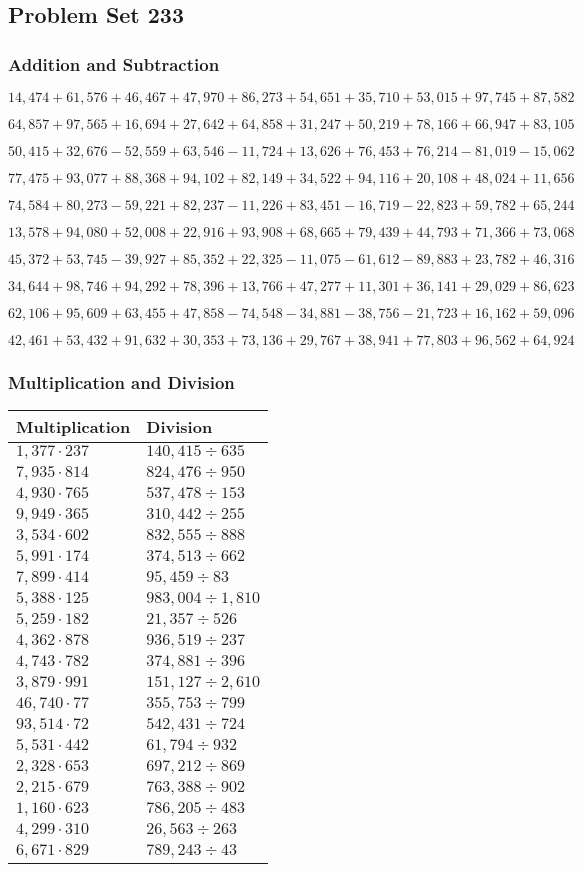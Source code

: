 \hypertarget{problem-set-233}{%
\subsection{Problem Set 233}\label{problem-set-233}}

\hypertarget{addition-and-subtraction}{%
\subsubsection{Addition and
Subtraction}\label{addition-and-subtraction}}

\(14,474+61,576+46,467+47,970+86,273+54,651+35,710+53,015+97,745+87,582\)

\(64,857+97,565+16,694+27,642+64,858+31,247+50,219+78,166+66,947+83,105\)

\(50,415+32,676-52,559+63,546-11,724+13,626+76,453+76,214-81,019-15,062\)

\(77,475+93,077+88,368+94,102+82,149+34,522+94,116+20,108+48,024+11,656\)

\(74,584+80,273-59,221+82,237-11,226+83,451-16,719-22,823+59,782+65,244\)

\(13,578+94,080+52,008+22,916+93,908+68,665+79,439+44,793+71,366+73,068\)

\(45,372+53,745-39,927+85,352+22,325-11,075-61,612-89,883+23,782+46,316\)

\(34,644+98,746+94,292+78,396+13,766+47,277+11,301+36,141+29,029+86,623\)

\(62,106+95,609+63,455+47,858-74,548-34,881-38,756-21,723+16,162+59,096\)

\(42,461+53,432+91,632+30,353+73,136+29,767+38,941+77,803+96,562+64,924\)

\hypertarget{multiplication-and-division}{%
\subsubsection{Multiplication and
Division}\label{multiplication-and-division}}

\begin{longtable}[]{@{}ll@{}}
\toprule
Multiplication & Division\tabularnewline
\midrule
\endhead
\(1,377\cdot237\) & \(140,415÷635\)\tabularnewline
\(7,935\cdot814\) & \(824,476÷950\)\tabularnewline
\(4,930\cdot765\) & \(537,478÷153\)\tabularnewline
\(9,949\cdot365\) & \(310,442÷255\)\tabularnewline
\(3,534\cdot602\) & \(832,555÷888\)\tabularnewline
\(5,991\cdot174\) & \(374,513÷662\)\tabularnewline
\(7,899\cdot414\) & \(95,459÷83\)\tabularnewline
\(5,388\cdot125\) & \(983,004÷1,810\)\tabularnewline
\(5,259\cdot182\) & \(21,357÷526\)\tabularnewline
\(4,362\cdot878\) & \(936,519÷237\)\tabularnewline
\(4,743\cdot782\) & \(374,881÷396\)\tabularnewline
\(3,879\cdot991\) & \(151,127÷2,610\)\tabularnewline
\(46,740\cdot77\) & \(355,753÷799\)\tabularnewline
\(93,514\cdot72\) & \(542,431÷724\)\tabularnewline
\(5,531\cdot442\) & \(61,794÷932\)\tabularnewline
\(2,328\cdot653\) & \(697,212÷869\)\tabularnewline
\(2,215\cdot679\) & \(763,388÷902\)\tabularnewline
\(1,160\cdot623\) & \(786,205÷483\)\tabularnewline
\(4,299\cdot310\) & \(26,563÷263\)\tabularnewline
\(6,671\cdot829\) & \(789,243÷43\)\tabularnewline
\bottomrule
\end{longtable}
